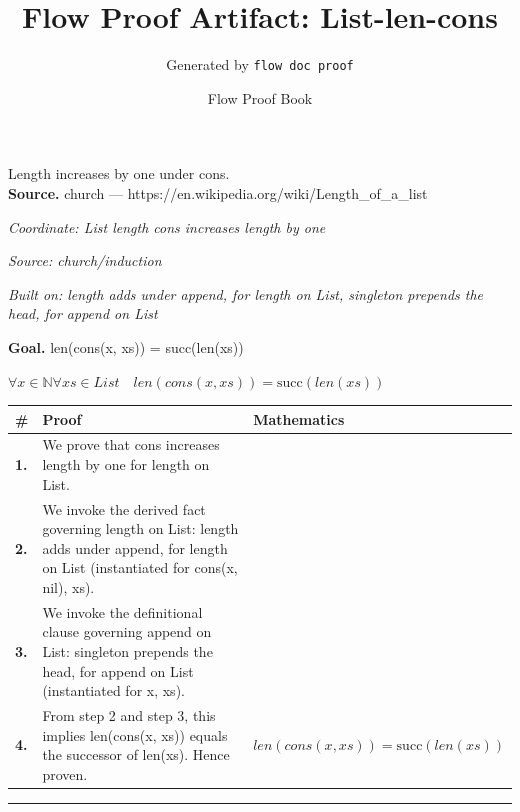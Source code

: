 \documentclass[11pt]{article}
\title{Flow Proof Artifact: List-len-cons}
\author{Generated by \texttt{flow doc proof}}
\date{Flow Proof Book}
\theoremstyle{definition}
\begin{document}
\maketitle
Length increases by one under cons.\\[0.5em]
\textbf{Source.} church — https://en.wikipedia.org/wiki/Length\_of\_a\_list\\[0.5em]
\bigskip
{}\par
\smallskip\noindent\textit{Coordinate: List \cdot length \cdot cons increases length by one}\par
\smallskip\noindent\textit{Source: church/induction}\par
\smallskip\noindent\textit{Built on: length adds under append, for length on List, singleton prepends the head, for append on List}\par
\medskip
\noindent\textbf{Goal.} len(cons(x, xs)) = succ(len(xs))\par
\noindent$\displaystyle \forall x \in \mathbb{N} \forall xs \in List\quad len(cons(x, xs)) = \mathrm{succ}(len(xs))$\par
\medskip
\noindent
\begin{tabular}{@{} >{\raggedright\arraybackslash}p{} >{\raggedright\arraybackslash}p{} >{\raggedleft\arraybackslash}p{} @{}}
\textbf{\#} & \textbf{Proof} & \textbf{Mathematics} \\
\midrule
\textbf{1.} & We prove that cons increases length by one for length on List. & \\[0.45em]
\textbf{2.} & We invoke the derived fact governing length on List: length adds under append, for length on List (instantiated for cons(x, nil), xs). & \\[0.45em]
\textbf{3.} & We invoke the definitional clause governing append on List: singleton prepends the head, for append on List (instantiated for x, xs). & \\[0.45em]
\textbf{4.} & From step 2 and step 3, this implies len(cons(x, xs)) equals the successor of len(xs). Hence proven. & $\displaystyle len(cons(x, xs)) = \mathrm{succ}(len(xs))$ \\[0.45em]
\bottomrule
\end{tabular}
\label{thm:List-length-cons_increases_length_by_one}
\par\medskip\hrule
\end{document}
